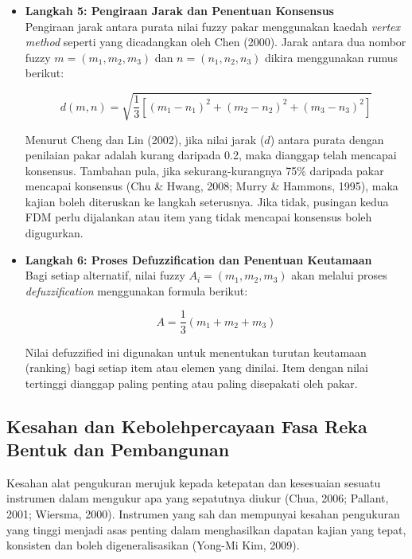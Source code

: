 \begin{itemize}
\begin{itemize}
  \item \textbf{Langkah 5: Pengiraan Jarak dan Penentuan Konsensus} \\
  Pengiraan jarak antara purata nilai fuzzy pakar menggunakan kaedah \textit{vertex method} seperti yang dicadangkan oleh Chen (2000). Jarak antara dua nombor fuzzy \( m = (m_1, m_2, m_3) \) dan \( n = (n_1, n_2, n_3) \) dikira menggunakan rumus berikut:

  

\[
  d(m,n) = \sqrt{\frac{1}{3} \left[ (m_1 - n_1)^2 + (m_2 - n_2)^2 + (m_3 - n_3)^2 \right]}
  \]



  Menurut Cheng dan Lin (2002), jika nilai jarak (\(d\)) antara purata dengan penilaian pakar adalah kurang daripada 0.2, maka dianggap telah mencapai konsensus. Tambahan pula, jika sekurang-kurangnya 75\% daripada pakar mencapai konsensus (Chu \& Hwang, 2008; Murry \& Hammons, 1995), maka kajian boleh diteruskan ke langkah seterusnya. Jika tidak, pusingan kedua FDM perlu dijalankan atau item yang tidak mencapai konsensus boleh digugurkan.

  \item \textbf{Langkah 6: Proses Defuzzification dan Penentuan Keutamaan} \\
  Bagi setiap alternatif, nilai fuzzy \( A_i = (m_1, m_2, m_3) \) akan melalui proses \textit{defuzzification} menggunakan formula berikut:

  

\[
  A = \frac{1}{3}(m_1 + m_2 + m_3)
  \]



  Nilai defuzzified ini digunakan untuk menentukan turutan keutamaan (ranking) bagi setiap item atau elemen yang dinilai. Item dengan nilai tertinggi dianggap paling penting atau paling disepakati oleh pakar.
\end{itemize}
\subsection{Kesahan dan Kebolehpercayaan Fasa Reka Bentuk dan Pembangunan}

Kesahan alat pengukuran merujuk kepada ketepatan dan kesesuaian sesuatu instrumen dalam mengukur apa yang sepatutnya diukur (Chua, 2006; Pallant, 2001; Wiersma, 2000). Instrumen yang sah dan mempunyai kesahan pengukuran yang tinggi menjadi asas penting dalam menghasilkan dapatan kajian yang tepat, konsisten dan boleh digeneralisasikan (Yong-Mi Kim, 2009).


\end{itemize}
